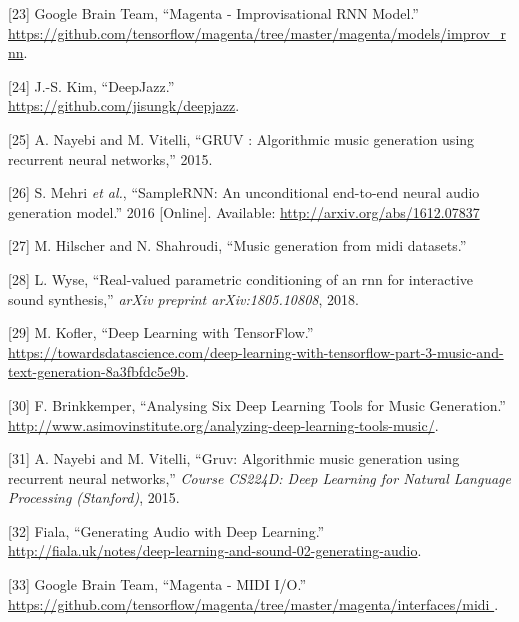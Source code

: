 \documentclass[12pt,]{article}
\begin{document}
\leavevmode\hypertarget{ref-magentaimprov}{}%
{[}23{]} \relax Google Brain Team, ``Magenta - Improvisational RNN
Model.'' \\
\url{https://github.com/tensorflow/magenta/tree/master/magenta/models/improv_rnn}.

\leavevmode\hypertarget{ref-deepjazz}{}%
{[}24{]} J.-S. Kim, ``DeepJazz.'' \\
\url{https://github.com/jisungk/deepjazz}.

\leavevmode\hypertarget{ref-Nayebi2015GRUVA}{}%
{[}25{]} A. Nayebi and M. Vitelli, ``GRUV : Algorithmic music generation
using recurrent neural networks,'' 2015.

\leavevmode\hypertarget{ref-mehri2016samplernn}{}%
{[}26{]} S. Mehri \emph{et al.}, ``SampleRNN: An unconditional
end-to-end neural audio generation model.'' 2016 {[}Online{]}.
Available: \url{http://arxiv.org/abs/1612.07837}

\leavevmode\hypertarget{ref-hilschermusic}{}%
{[}27{]} M. Hilscher and N. Shahroudi, ``Music generation from midi
datasets.''

\leavevmode\hypertarget{ref-wyse2018real}{}%
{[}28{]} L. Wyse, ``Real-valued parametric conditioning of an rnn for
interactive sound synthesis,'' \emph{arXiv preprint arXiv:1805.10808},
2018.

\leavevmode\hypertarget{ref-mkofler}{}%
{[}29{]} M. Kofler, ``Deep Learning with TensorFlow.'' \\
\url{https://towardsdatascience.com/deep-learning-with-tensorflow-part-3-music-and-text-generation-8a3fbfdc5e9b}.

\leavevmode\hypertarget{ref-asimovinst}{}%
{[}30{]} F. Brinkkemper, ``Analysing Six Deep Learning Tools for Music
Generation.'' \\
\url{http://www.asimovinstitute.org/analyzing-deep-learning-tools-music/}.

\leavevmode\hypertarget{ref-nayebi2015gruv}{}%
{[}31{]} A. Nayebi and M. Vitelli, ``Gruv: Algorithmic music generation
using recurrent neural networks,'' \emph{Course CS224D: Deep Learning
for Natural Language Processing (Stanford)}, 2015.

\leavevmode\hypertarget{ref-fiala}{}%
{[}32{]} \relax Fiala, ``Generating Audio with Deep Learning.'' \\
\url{http://fiala.uk/notes/deep-learning-and-sound-02-generating-audio}.

\leavevmode\hypertarget{ref-magentamidi}{}%
{[}33{]} \relax Google Brain Team, ``Magenta - MIDI I/O.'' \\
\href{https://github.com/tensorflow/magenta/tree/master/magenta/interfaces/midi\%0A}{https://github.com/tensorflow/magenta/tree/master/magenta/interfaces/midi
}.
\end{document}
